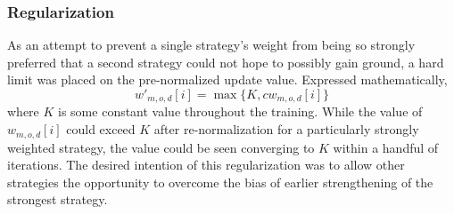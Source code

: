 

\subsubsection{Regularization}

As an attempt to prevent a single strategy's weight from being so strongly 
preferred that a second strategy could not hope to possibly gain ground,
a hard limit was placed on the pre-normalized update value.
%
Expressed mathematically,
\[
    w'_{m,o,d}[i] = \max\{K,cw_{m,o,d}[i]\}
\]
where $K$ is some constant value throughout the training.
%
While the value of $w_{m,o,d}[i]$ could exceed $K$ after re-normalization
for a particularly strongly weighted strategy,
the value could be seen converging to $K$ within a handful of iterations.
%
The desired intention of this regularization was to allow other strategies
the opportunity to overcome the bias of earlier strengthening of the strongest
strategy.
